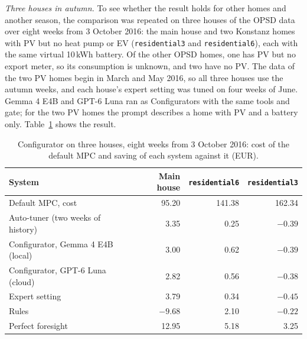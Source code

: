 \textit{Three houses in autumn.} To see whether the result holds for
other homes and another season, the comparison was repeated on three
houses of the OPSD data over eight weeks from 3 October 2016: the main
house and two Konstanz homes with PV but no heat pump or EV
(\texttt{residential3} and \texttt{residential6}), each with the same
virtual 10\,kWh battery. Of the other OPSD homes, one has PV but no
export meter, so its consumption is unknown, and two have no PV. The
data of the two PV homes begin in March and May 2016, so all three
houses use the autumn weeks, and each house's expert setting was tuned
on four weeks of June. Gemma 4 E4B and GPT-6 Luna ran as Configurators
with the same tools and gate; for the two PV homes the prompt describes
a home with PV and a battery only. Table~\ref{tab:confighouses} shows
the result.

\begin{table}[htbp]
\caption{Configurator on three houses, eight weeks from 3 October 2016:
cost of the default MPC and saving of each system against it (EUR).}
\label{tab:confighouses}
\small
\begin{tabularx}{\textwidth}{@{}Xrrr@{}}
\toprule
System & Main house & \texttt{residential6} & \texttt{residential3} \\
\midrule
Default MPC, cost & 95.20 & 141.38 & 162.34 \\
\midrule
Auto-tuner (two weeks of history) & 3.35 & 0.25 & $-0.39$ \\
Configurator, Gemma 4 E4B (local) & 3.00 & 0.62 & $-0.39$ \\
Configurator, GPT-6 Luna (cloud) & 2.82 & 0.56 & $-0.38$ \\
Expert setting & 3.79 & 0.34 & $-0.45$ \\
Rules & $-9.68$ & 2.10 & $-0.22$ \\
Perfect foresight & 12.95 & 5.18 & 3.25 \\
\bottomrule
\end{tabularx}
\end{table}

